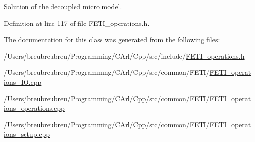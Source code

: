 Solution of the decoupled micro model. 



Definition at line 117 of file F\+E\+T\+I\+\_\+operations.\+h.



The documentation for this class was generated from the following files\+:\begin{DoxyCompactItemize}
\item 
/\+Users/breubreubreu/\+Programming/\+C\+Arl/\+Cpp/src/include/\hyperlink{_f_e_t_i__operations_8h}{F\+E\+T\+I\+\_\+operations.\+h}\item 
/\+Users/breubreubreu/\+Programming/\+C\+Arl/\+Cpp/src/common/\+F\+E\+T\+I/\hyperlink{_f_e_t_i__operations___i_o_8cpp}{F\+E\+T\+I\+\_\+operations\+\_\+\+I\+O.\+cpp}\item 
/\+Users/breubreubreu/\+Programming/\+C\+Arl/\+Cpp/src/common/\+F\+E\+T\+I/\hyperlink{_f_e_t_i__operations__operations_8cpp}{F\+E\+T\+I\+\_\+operations\+\_\+operations.\+cpp}\item 
/\+Users/breubreubreu/\+Programming/\+C\+Arl/\+Cpp/src/common/\+F\+E\+T\+I/\hyperlink{_f_e_t_i__operations__setup_8cpp}{F\+E\+T\+I\+\_\+operations\+\_\+setup.\+cpp}\end{DoxyCompactItemize}
